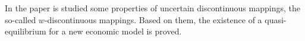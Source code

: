 
In the paper is studied some properties of uncertain discontinuous mappings, the so-called $w$-discontinuous mappings. Based on them, the existence of a quasi-equilibrium for a new economic model is proved.

